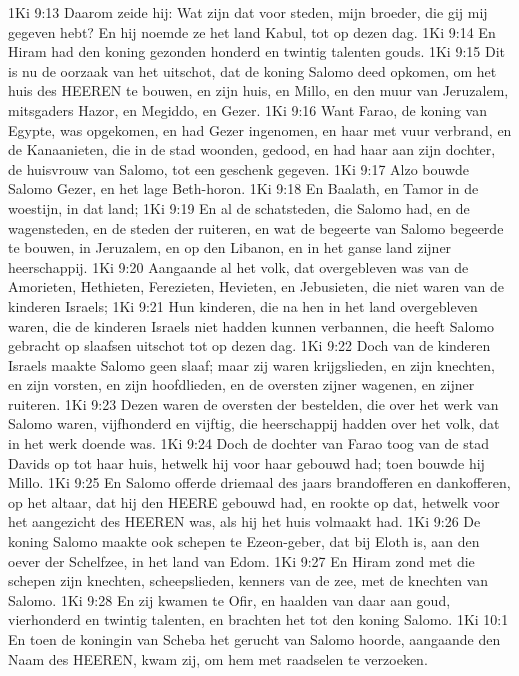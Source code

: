 1Ki 9:13  Daarom zeide hij: Wat zijn dat voor steden, mijn broeder, die gij mij gegeven hebt? En hij noemde ze het land Kabul, tot op dezen dag.
1Ki 9:14  En Hiram had den koning gezonden honderd en twintig talenten gouds.
1Ki 9:15  Dit is nu de oorzaak van het uitschot, dat de koning Salomo deed opkomen, om het huis des HEEREN te bouwen, en zijn huis, en Millo, en den muur van Jeruzalem, mitsgaders Hazor, en Megiddo, en Gezer.
1Ki 9:16  Want Farao, de koning van Egypte, was opgekomen, en had Gezer ingenomen, en haar met vuur verbrand, en de Kanaanieten, die in de stad woonden, gedood, en had haar aan zijn dochter, de huisvrouw van Salomo, tot een geschenk gegeven.
1Ki 9:17  Alzo bouwde Salomo Gezer, en het lage Beth-horon.
1Ki 9:18  En Baalath, en Tamor in de woestijn, in dat land;
1Ki 9:19  En al de schatsteden, die Salomo had, en de wagensteden, en de steden der ruiteren, en wat de begeerte van Salomo begeerde te bouwen, in Jeruzalem, en op den Libanon, en in het ganse land zijner heerschappij.
1Ki 9:20  Aangaande al het volk, dat overgebleven was van de Amorieten, Hethieten, Ferezieten, Hevieten, en Jebusieten, die niet waren van de kinderen Israels;
1Ki 9:21  Hun kinderen, die na hen in het land overgebleven waren, die de kinderen Israels niet hadden kunnen verbannen, die heeft Salomo gebracht op slaafsen uitschot tot op dezen dag.
1Ki 9:22  Doch van de kinderen Israels maakte Salomo geen slaaf; maar zij waren krijgslieden, en zijn knechten, en zijn vorsten, en zijn hoofdlieden, en de oversten zijner wagenen, en zijner ruiteren.
1Ki 9:23  Dezen waren de oversten der bestelden, die over het werk van Salomo waren, vijfhonderd en vijftig, die heerschappij hadden over het volk, dat in het werk doende was.
1Ki 9:24  Doch de dochter van Farao toog van de stad Davids op tot haar huis, hetwelk hij voor haar gebouwd had; toen bouwde hij Millo.
1Ki 9:25  En Salomo offerde driemaal des jaars brandofferen en dankofferen, op het altaar, dat hij den HEERE gebouwd had, en rookte op dat, hetwelk voor het aangezicht des HEEREN was, als hij het huis volmaakt had.
1Ki 9:26  De koning Salomo maakte ook schepen te Ezeon-geber, dat bij Eloth is, aan den oever der Schelfzee, in het land van Edom.
1Ki 9:27  En Hiram zond met die schepen zijn knechten, scheepslieden, kenners van de zee, met de knechten van Salomo.
1Ki 9:28  En zij kwamen te Ofir, en haalden van daar aan goud, vierhonderd en twintig talenten, en brachten het tot den koning Salomo.
1Ki 10:1  En toen de koningin van Scheba het gerucht van Salomo hoorde, aangaande den Naam des HEEREN, kwam zij, om hem met raadselen te verzoeken.
